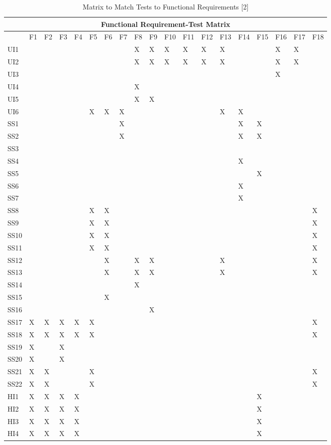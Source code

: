 \documentclass[11pt]{article}
\begin{document}
\begin{table}[H]
\centering
\caption{Matrix to Match Tests to Functional Requirements [2]}
\label{label2}
\begin{tabular}{| l | l | l | l | l | l | l | l | l | l | l | l | l | l | l | l | l | l | l |}
\hline
\multicolumn{19}{|c|}{\textbf{Functional Requirement-Test Matrix}}                          \\ \hline
 & \tiny{F1} & \tiny{F2} & \tiny{F3} & \tiny{F4} & \tiny{F5} & \tiny{F6} & \tiny{F7} & \tiny{F8} & \tiny{F9} & \tiny{F10} & \tiny{F11} & \tiny{F12} & \tiny{F13} & \tiny{F14} & \tiny{F15} & \tiny{F16} & \tiny{F17} & \tiny{F18} \\ \hline
UI1&&&&&&&&X&X&X&X&X&X&&&X&X& \\ \hline
UI2&&&&&&&&X&X&X&X&X&X&&&X&X& \\ \hline
UI3&&&&&&&&&&&&&&&&X&& \\ \hline
UI4&&&&&&&&X&&&&&&&&&& \\ \hline
UI5&&&&&&&&X&X&&&&&&&&& \\ \hline
UI6&&&&&X&X&X&&&&&&X&X&&&& \\ \hline
SS1&&&&&&&X&&&&&&&X&X&&& \\ \hline
SS2&&&&&&&X&&&&&&&X&X&&& \\ \hline
SS3&&&&&&&&&&&&&&&&&& \\ \hline
SS4&&&&&&&&&&&&&&X&&&& \\ \hline
SS5&&&&&&&&&&&&&&&X&&& \\ \hline
SS6&&&&&&&&&&&&&&X&&&& \\ \hline
SS7&&&&&&&&&&&&&&X&&&& \\ \hline
SS8&&&&&X&X&&&&&&&&&&&&X \\ \hline
SS9&&&&&X&X&&&&&&&&&&&&X \\ \hline
SS10&&&&&X&X&&&&&&&&&&&&X \\ \hline
SS11&&&&&X&X&&&&&&&&&&&&X \\ \hline
SS12&&&&&&X&&X&X&&&&X&&&&&X \\ \hline
SS13&&&&&&X&&X&X&&&&X&&&&&X \\ \hline
SS14&&&&&&&&X&&&&&&&&&& \\ \hline
SS15&&&&&&X&&&&&&&&&&&& \\ \hline
SS16&&&&&&&&&X&&&&&&&&& \\ \hline
SS17&X&X&X&X&X&&&&&&&&&&&&&X \\ \hline
SS18&X&X&X&X&X&&&&&&&&&&&&&X \\ \hline
SS19&X&&X&&&&&&&&&&&&&&& \\ \hline
SS20&X&&X&&&&&&&&&&&&&&& \\ \hline
SS21&X&X&&&X&&&&&&&&&&&&&X \\ \hline
SS22&X&X&&&X&&&&&&&&&&&&&X \\ \hline
HI1&X&X&X&X&&&&&&&&&&&X&&& \\ \hline
HI2&X&X&X&X&&&&&&&&&&&X&&& \\ \hline
HI3&X&X&X&X&&&&&&&&&&&X&&& \\ \hline
HI4&X&X&X&X&&&&&&&&&&&X&&& \\ \hline
\end{tabular}
\end{table}
\end{document}
